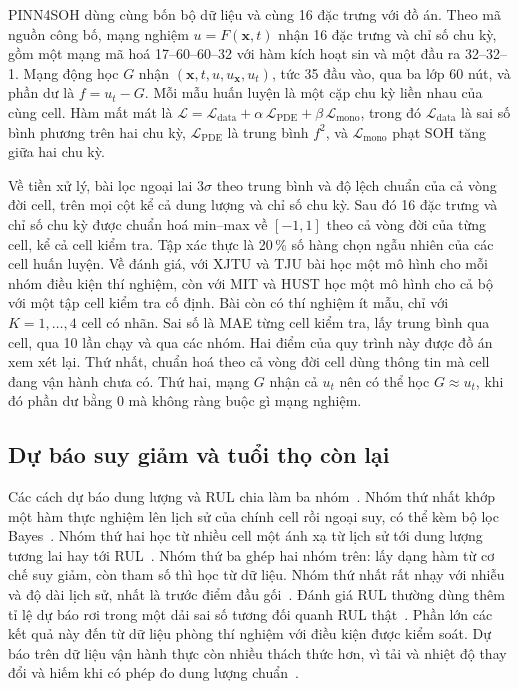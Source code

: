 PINN4SOH dùng cùng bốn bộ dữ liệu và cùng 16 đặc trưng với đồ án. Theo mã nguồn công bố, mạng nghiệm $u = F(\mathbf{x},
t)$ nhận 16 đặc trưng và chỉ số chu kỳ, gồm một mạng mã hoá 17--60--60--32 với hàm kích hoạt sin và một đầu ra
32--32--1. Mạng động học $G$ nhận $(\mathbf{x}, t, u, u_\mathbf{x}, u_t)$, tức 35 đầu vào, qua ba lớp 60 nút, và phần dư
là $f = u_t - G$. Mỗi mẫu huấn luyện là một cặp chu kỳ liền nhau của cùng cell. Hàm mất mát là $\mathcal{L} =
\mathcal{L}_\text{data} + \alpha\,\mathcal{L}_\text{PDE} + \beta\,\mathcal{L}_\text{mono}$, trong đó
$\mathcal{L}_\text{data}$ là sai số bình phương trên hai chu kỳ, $\mathcal{L}_\text{PDE}$ là trung bình $f^2$, và
$\mathcal{L}_\text{mono}$ phạt SOH tăng giữa hai chu kỳ.

Về tiền xử lý, bài lọc ngoại lai $3\sigma$ theo trung bình và độ lệch chuẩn của cả vòng đời cell, trên mọi cột kể cả dung
lượng và chỉ số chu kỳ. Sau đó 16 đặc trưng và chỉ số chu kỳ được chuẩn hoá min--max về $[-1, 1]$ theo cả vòng đời của
từng cell, kể cả cell kiểm tra. Tập xác thực là 20\,\% số hàng chọn ngẫu nhiên của các cell huấn luyện. Về đánh giá, với
XJTU và TJU bài học một mô hình cho mỗi nhóm điều kiện thí nghiệm, còn với MIT và HUST học một mô hình cho cả bộ với một
tập cell kiểm tra cố định. Bài còn có thí nghiệm ít mẫu, chỉ với $K = 1, \dots, 4$ cell có nhãn. Sai số là MAE từng cell
kiểm tra, lấy trung bình qua cell, qua 10 lần chạy và qua các nhóm. Hai điểm của quy trình này được đồ án xem xét lại. Thứ
nhất, chuẩn hoá theo cả vòng đời cell dùng thông tin mà cell đang vận hành chưa có. Thứ hai, mạng $G$ nhận cả $u_t$ nên có
thể học $G \approx u_t$, khi đó phần dư bằng 0 mà không ràng buộc gì mạng nghiệm.

\subsection{Dự báo suy giảm và tuổi thọ còn lại}

Các cách dự báo dung lượng và RUL chia làm ba nhóm~\cite{hu2020joule}. Nhóm thứ nhất khớp một hàm thực nghiệm lên lịch sử
của chính cell rồi ngoại suy, có thể kèm bộ lọc Bayes~\cite{he2011}. Nhóm thứ hai học từ nhiều cell một ánh xạ từ lịch sử
tới dung lượng tương lai hay tới RUL~\cite{zhang2018lstm,severson2019}. Nhóm thứ ba ghép hai nhóm trên: lấy dạng hàm từ cơ
chế suy giảm, còn tham số thì học từ dữ liệu. Nhóm thứ nhất rất nhạy với nhiễu và độ dài lịch sử, nhất là trước điểm đầu
gối~\cite{attia2022knee,fermin2020}. Đánh giá RUL thường dùng thêm tỉ lệ dự báo rơi trong một dải sai số tương đối quanh
RUL thật~\cite{saxena2008}. Phần lớn các kết quả này đến từ dữ liệu phòng thí nghiệm với điều kiện được kiểm soát. Dự báo
trên dữ liệu vận hành thực còn nhiều thách thức hơn, vì tải và nhiệt độ thay đổi và hiếm khi có phép đo dung lượng
chuẩn~\cite{sulzer2021}.


